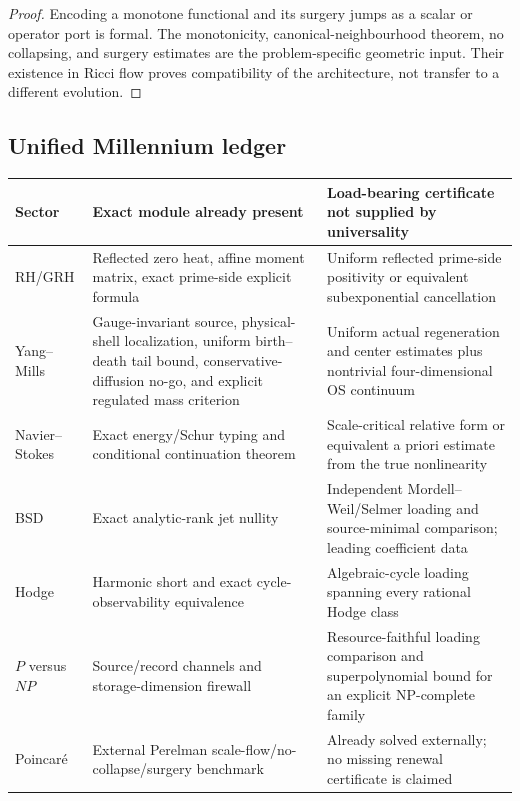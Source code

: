 \documentclass[11pt]{article}
\theoremstyle{definition}
\theoremstyle{remark}
\begin{document}
\begin{proof}
Encoding a monotone functional and its surgery jumps as a scalar or operator
port is formal.  The monotonicity, canonical-neighbourhood theorem, no
collapsing, and surgery estimates are the problem-specific geometric input.
Their existence in Ricci flow proves compatibility of the architecture, not
transfer to a different evolution.
\end{proof}

\subsection{Unified Millennium ledger}

\begingroup
\small
\setlength{\tabcolsep}{3.5pt}
\begin{longtable}{L{0.18\textwidth}L{0.31\textwidth}L{0.39\textwidth}}
\toprule
\textbf{Sector} & \textbf{Exact module already present} &
\textbf{Load-bearing certificate not supplied by universality}\\
\midrule
\endhead
RH/GRH
& Reflected zero heat, affine moment matrix, exact prime-side explicit formula
& Uniform reflected prime-side positivity or equivalent subexponential cancellation\\
\addlinespace
Yang--Mills
& Gauge-invariant source, physical-shell localization, uniform birth--death tail bound, conservative-diffusion no-go, and explicit regulated mass criterion
& Uniform actual regeneration and center estimates plus nontrivial four-dimensional OS continuum\\
\addlinespace
Navier--Stokes
& Exact energy/Schur typing and conditional continuation theorem
& Scale-critical relative form or equivalent a priori estimate from the true nonlinearity\\
\addlinespace
BSD
& Exact analytic-rank jet nullity
& Independent Mordell--Weil/Selmer loading and source-minimal comparison; leading coefficient data\\
\addlinespace
Hodge
& Harmonic short and exact cycle-observability equivalence
& Algebraic-cycle loading spanning every rational Hodge class\\
\addlinespace
$P$ versus $NP$
& Source/record channels and storage-dimension firewall
& Resource-faithful loading comparison and superpolynomial bound for an explicit NP-complete family\\
\addlinespace
Poincar\'e
& External Perelman scale-flow/no-collapse/surgery benchmark
& Already solved externally; no missing renewal certificate is claimed\\
\bottomrule
\end{longtable}
\endgroup
\end{document}
